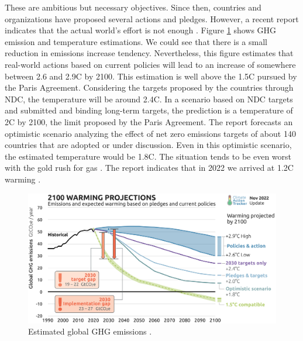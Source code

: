 These are ambitious but necessary objectives. Since then, countries and organizations have proposed several actions and pledges. However, a recent report indicates that the actual world's effort is not enough \cite{tracker2022projections}. Figure \ref{fig:ghg_cat} shows GHG emission and temperature estimations. We could see that there is a small reduction in emissions increase tendency. Nevertheless, this figure estimates that real-world actions based on current policies will lead to an increase of somewhere between 2.6 and 2.9\degree C by 2100. This estimation is well above the 1.5\degree C pursued by the Paris Agreement. Considering the targets proposed by the countries through NDC, the temperature will be around 2.4\degree C. In a scenario based on NDC targets and submitted and binding long-term targets, the prediction is a temperature of 2\degree C by 2100, the limit proposed by the Paris Agreement. The report forecasts an optimistic scenario analyzing the effect of net zero emissions targets of about 140 countries that are adopted or under discussion. Even in this optimistic scenario, the estimated temperature would be 1.8\degree C. The situation tends to be even worst with the gold rush for gas \cite{tracker2022massive}. The report indicates that in 2022 we arrived at 1.2\degree C warming \cite{tracker2022projections}.

\begin{figure}[!htb]
    \centering
    \includegraphics[scale=0.09]{Images/Related_works/Emissions_2022-11.png}
    \caption{Estimated global GHG emissions \cite{tracker2022projections}.}
    \label{fig:ghg_cat}
\end{figure}

